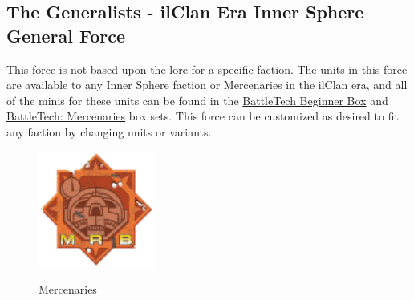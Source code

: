 \subsection{The Generalists - ilClan Era Inner Sphere General Force}

This force is not based upon the lore for a specific faction.
The units in this force are available to any Inner Sphere faction or Mercenaries in the ilClan era, and all of the minis for these units can be found in the \href{https://www.sarna.net/wiki/BattleTech_Beginner_Box}{BattleTech Beginner Box} and \href{https://www.sarna.net/wiki/BattleTech:_Mercenaries}{BattleTech: Mercenaries} box sets.
This force can be customized as desired to fit any faction by changing units or variants.

\begin{figure}[!h]
  \centering
  \includegraphics[alt='Mercenary Logo', width=1.5in, height=1.5in]{img/Mercenary.png}
  \caption*{Mercenaries}
\end{figure}

